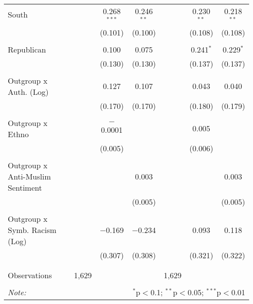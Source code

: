 \begin{table}[H]
\begin{tabular}{@{\extracolsep{5pt}}lcccccc}
 South &  & 0.268$^{***}$ & 0.246$^{**}$ &  & 0.230$^{**}$ & 0.218$^{**}$ \\ 
  &  & (0.101) & (0.100) &  & (0.108) & (0.108) \\ 
  & & & & & & \\ 
 Republican &  & 0.100 & 0.075 &  & 0.241$^{*}$ & 0.229$^{*}$ \\ 
  &  & (0.130) & (0.130) &  & (0.137) & (0.137) \\ 
  & & & & & & \\ 
 Outgroup x Auth. (Log) &  & 0.127 & 0.107 &  & 0.043 & 0.040 \\ 
  &  & (0.170) & (0.170) &  & (0.180) & (0.179) \\ 
  & & & & & & \\ 
 Outgroup x Ethno &  & $-$0.0001 &  &  & 0.005 &  \\ 
  &  & (0.005) &  &  & (0.006) &  \\ 
  & & & & & & \\ 
 Outgroup x Anti-Muslim Sentiment &  &  & 0.003 &  &  & 0.003 \\ 
  &  &  & (0.005) &  &  & (0.005) \\ 
  & & & & & & \\ 
 Outgroup x Symb. Racism (Log) &  & $-$0.169 & $-$0.234 &  & 0.093 & 0.118 \\ 
  &  & (0.307) & (0.308) &  & (0.321) & (0.322) \\ 
  & & & & & & \\ 
\hline \\[-1.8ex] 
Observations & 1,629 &  &  & 1,629 &  &  \\ 
\hline 
\hline \\[-1.8ex] 
\textit{Note:}  & \multicolumn{6}{r}{$^{*}$p$<$0.1; $^{**}$p$<$0.05; $^{***}$p$<$0.01} \\ 
\end{tabular} 
\end{table} 
